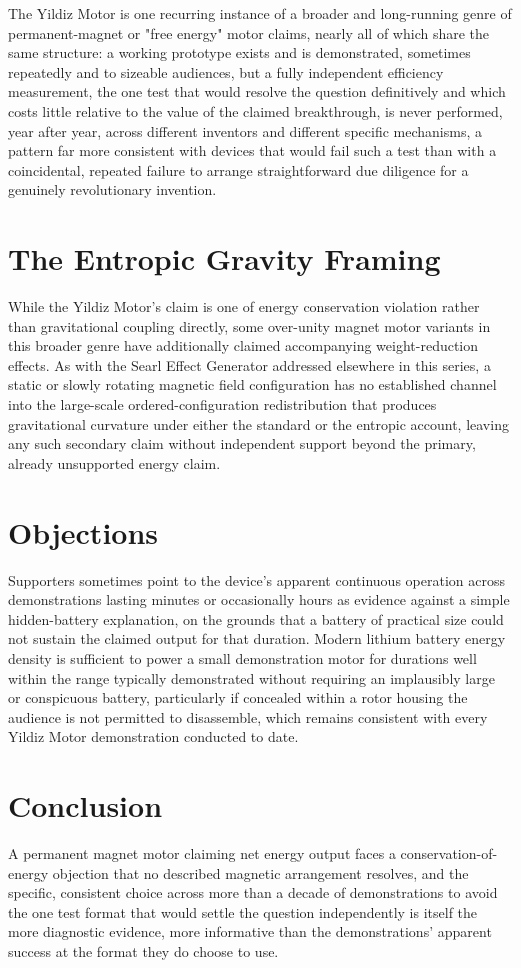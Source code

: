 \documentclass[11pt]{article}
\begin{document}
The Yildiz Motor is one recurring instance of a broader and long-running genre of permanent-magnet or "free energy" motor claims, nearly all of which share the same structure: a working prototype exists and is demonstrated, sometimes repeatedly and to sizeable audiences, but a fully independent efficiency measurement, the one test that would resolve the question definitively and which costs little relative to the value of the claimed breakthrough, is never performed, year after year, across different inventors and different specific mechanisms, a pattern far more consistent with devices that would fail such a test than with a coincidental, repeated failure to arrange straightforward due diligence for a genuinely revolutionary invention.

\section{The Entropic Gravity Framing}

While the Yildiz Motor's claim is one of energy conservation violation rather than gravitational coupling directly, some over-unity magnet motor variants in this broader genre have additionally claimed accompanying weight-reduction effects. As with the Searl Effect Generator addressed elsewhere in this series, a static or slowly rotating magnetic field configuration has no established channel into the large-scale ordered-configuration redistribution that produces gravitational curvature under either the standard or the entropic account, leaving any such secondary claim without independent support beyond the primary, already unsupported energy claim.

\section{Objections}

Supporters sometimes point to the device's apparent continuous operation across demonstrations lasting minutes or occasionally hours as evidence against a simple hidden-battery explanation, on the grounds that a battery of practical size could not sustain the claimed output for that duration. Modern lithium battery energy density is sufficient to power a small demonstration motor for durations well within the range typically demonstrated without requiring an implausibly large or conspicuous battery, particularly if concealed within a rotor housing the audience is not permitted to disassemble, which remains consistent with every Yildiz Motor demonstration conducted to date.

\section{Conclusion}

A permanent magnet motor claiming net energy output faces a conservation-of-energy objection that no described magnetic arrangement resolves, and the specific, consistent choice across more than a decade of demonstrations to avoid the one test format that would settle the question independently is itself the more diagnostic evidence, more informative than the demonstrations' apparent success at the format they do choose to use.
\end{document}
